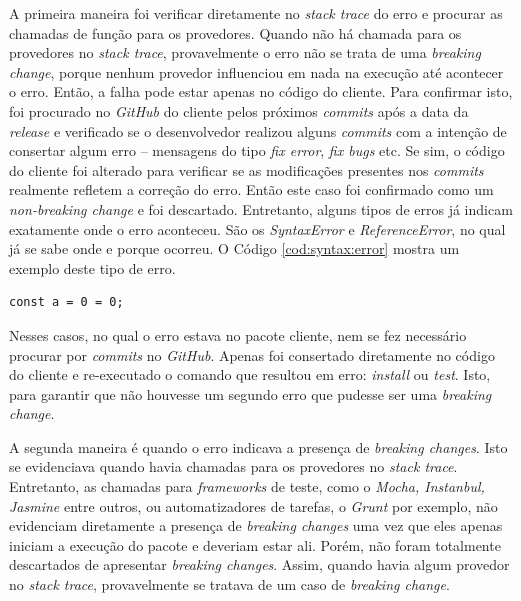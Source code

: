 A primeira maneira foi verificar diretamente no \textit{stack trace} do erro e procurar as chamadas de função para os provedores. Quando não há chamada para os provedores no \textit{stack trace}, provavelmente o erro não se trata de uma \textit{breaking change}, porque nenhum provedor influenciou em nada na execução até acontecer o erro. Então, a falha pode estar apenas no código do cliente. Para confirmar isto, foi procurado no \textit{GitHub} do cliente pelos próximos \textit{commits} após a data da \textit{release} e verificado se o desenvolvedor realizou alguns \textit{commits} com a intenção de consertar algum erro -- mensagens do tipo \textit{fix error}, \textit{fix bugs} etc. Se sim, o código do cliente foi alterado para verificar se as modificações presentes nos \textit{commits} realmente refletem a correção do erro. Então este caso foi confirmado como um \textit{non-breaking change} e foi descartado. Entretanto, alguns tipos de erros já indicam exatamente onde o erro aconteceu. São os \textit{SyntaxError} e \textit{ReferenceError}, no qual já se sabe onde e porque ocorreu. O Código \ref{cod:syntax:error} mostra um exemplo deste tipo de erro.

\begin{lstlisting}[style=Javascript, label=cod:syntax:error, caption={Código com um Reference Error}]
const a = 0 = 0;
\end{lstlisting}

Nesses casos, no qual o erro estava no pacote cliente, nem se fez necessário procurar por \textit{commits} no \textit{GitHub}. Apenas foi consertado diretamente no código do cliente e re-executado o comando que resultou em erro: \textit{install} ou \textit{test}. Isto, para garantir que não houvesse um segundo erro que pudesse ser uma \textit{breaking change}.

A segunda maneira é quando o erro indicava a presença de \textit{breaking changes}. Isto se evidenciava quando havia chamadas para os provedores no \textit{stack trace}. Entretanto, as chamadas para \textit{frameworks} de teste, como o \textit{Mocha, Instanbul, Jasmine} entre outros, ou automatizadores de tarefas, o \textit{Grunt} por exemplo, não evidenciam diretamente a presença de \textit{breaking changes} uma vez que eles apenas iniciam a execução do pacote e deveriam estar ali. Porém, não foram totalmente descartados de apresentar \textit{breaking changes}. Assim, quando havia algum provedor no \textit{stack trace}, provavelmente se tratava de um caso de \textit{breaking change}.

